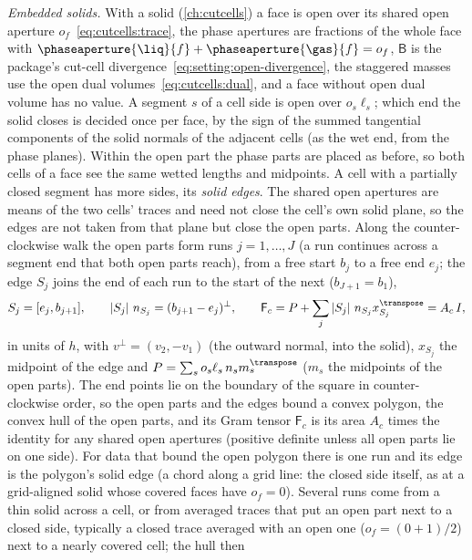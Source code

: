 \emph{Embedded solids.} With a solid (\cref{ch:cutcells}) a face is open over
its shared open aperture $o_f$~\cref{eq:cutcells:trace}, the phase
apertures are fractions of the whole face with
$\phaseaperture{\liq}{f}+\phaseaperture{\gas}{f}=o_f$, $\mathsf B$ is the
package's cut-cell divergence~\cref{eq:setting:open-divergence}, the
staggered masses use the open dual volumes~\cref{eq:cutcells:dual}, and a
face without open dual volume has no value. A segment $s$ of a cell side is
open over $o_s\ell_s$; which end the solid closes is decided once per face,
by the sign of the summed tangential components of the solid normals of the
adjacent cells (as the wet end, from the phase planes). Within the open part
the phase parts are placed as before, so both cells of a face see the same
wetted lengths and midpoints. A cell with a partially closed segment has more
sides, its \emph{solid edges}. The shared open apertures are means of the two
cells' traces and need not close the cell's own solid plane, so the edges are
not taken from that plane but close the open parts. Along the
counter-clockwise walk the open parts form runs $j=1,\dots,J$ (a run continues
across a segment end that both open parts reach), from a free start $b_j$ to a
free end $e_j$; the edge $S_j$ joins the end of each run to the start of the
next ($b_{J+1}=b_1$),
\begin{equation}\label{eq:projection:mimetic-solid-edge}
  S_j=[e_j,b_{j+1}],\qquad
  \abs{S_j}\,n_{S_j}=(b_{j+1}-e_j)^{\perp},\qquad
  \mathsf F_c=P+\sum_j\abs{S_j}\,n_{S_j}x_{S_j}^{\transpose}=A_c\,I,
\end{equation}
in units of $h$, with $v^{\perp}=(v_2,-v_1)$ (the outward normal, into the
solid), $x_{S_j}$ the midpoint of the edge and
$P=\sum_so_s\ell_s\,n_s m_s^{\transpose}$ ($m_s$ the midpoints of the open
parts). The end points lie on the boundary of the square in counter-clockwise
order, so the open parts and the edges bound a convex polygon, the convex hull
of the open parts, and its Gram tensor $\mathsf F_c$ is its area $A_c$ times
the identity for any shared open apertures (positive definite unless all open
parts lie on one side). For data that bound the open polygon there is one run
and its edge is the polygon's solid edge (a chord along a grid line: the closed
side itself, as at a grid-aligned solid whose covered faces have $o_f=0$).
Several runs come from a thin solid across a cell, or from averaged traces
that put an open part next to a closed side, typically a closed trace averaged
with an open one ($o_f=(0+1)/2$) next to a nearly covered cell; the hull then
